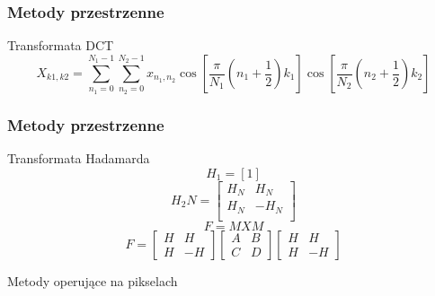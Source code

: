\documentclass{beamer}
\begin{document}
\begin{frame}
\frametitle{Metody przestrzenne}
\begin{block}{Transformata DCT}
\begin{equation}
X_{k1,k2}=\sum_{n_1=0}^{N_1-1}\sum_{n_2=0}^{N_2-1}x_{n_1,n_2}\cos\left[\frac{\pi}{N_1}\left(n_1+\frac{1}{2}\right)k_1\right]\cos\left[\frac{\pi}{N_2}\left(n_2+\frac{1}{2}\right)k_2\right]
\end{equation}
\end{block}


\end{frame}
\begin{frame}
\frametitle{Metody przestrzenne}
\begin{block}{Transformata Hadamarda}
 \begin{equation}
    H_1=\left[1\right] 
    \end{equation}
    \begin{equation}
           H_2N=\begin{bmatrix}
           H_N&H_N \\
           H_N&-H_N \\
           \end{bmatrix}
    \end{equation}
       \begin{equation}
       F=MXM
       \end{equation}
          \begin{equation}F=
          \begin{bmatrix}
          H& H\\
          H & -H
          \end{bmatrix}
          \begin{bmatrix}
          A& B\\
          C& D
          \end{bmatrix}
             \begin{bmatrix}
             H& H\\
             H & -H
             \end{bmatrix}
          \end{equation}


\end{block}


\end{frame}
\begin{frame}
\begin{center}
\Huge{Metody operujące na pikselach}
\end{center}


\end{frame}
\end{document}
